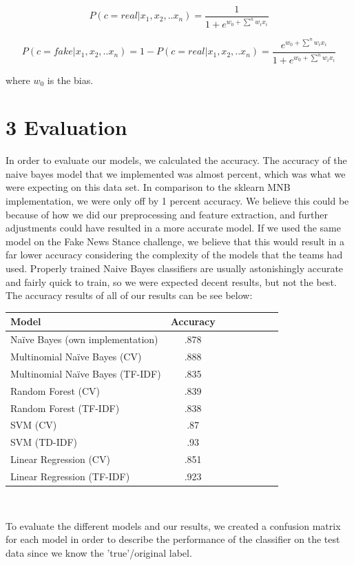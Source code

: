 \documentclass{neu_handout}
\begin{document}
$$P(c = real | x_1, x_2,..x_n) = \frac{1}{1 + e^{w_0 + \sum^n w_i x_i}} $$

$$P(c = fake | x_1, x_2,..x_n) = 1 - P(c = real | x_1, x_2,..x_n) = \frac{e^{w_0 + \sum^n w_i x_i}}{1+e^{w_0 + \sum^n w_i x_i}}$$

where $w_0$ is the bias.

\section*{3 Evaluation}

In order to evaluate our models, we calculated the accuracy. The accuracy of the naive bayes model that we implemented was almost percent, which was what we were expecting on this data set. In comparison to the sklearn MNB implementation, we were only off by 1 percent accuracy. We believe this could be because of how we did our preprocessing and feature extraction, and further adjustments could have resulted in a more accurate model. If we used the same model on the Fake News Stance challenge, we believe that this would result in a far lower accuracy considering the complexity of the models that the teams had used. Properly trained Naive Bayes classifiers are usually astonishingly accurate and fairly quick to train, so we were expected decent results, but not the best. The accuracy results of all of our results can be see below:

\begin{table}[h]
\centering
\begin{tabular}{l*{6}{c}r}
Model     & Accuracy  \\
\hline
Naïve Bayes  (own implementation) & .878   \\
Multinomial Naïve Bayes (CV)       & .888  \\
Multinomial Naïve Bayes (TF-IDF)      & .835  \\
Random Forest (CV)     & .839  \\
Random Forest (TF-IDF)     & .838  \\
SVM (CV)     & .87  \\
SVM (TD-IDF)     & .93  \\
Linear Regression (CV)  & .851 \\
Linear Regression (TF-IDF)  & .923 \\
\end{tabular}\\
\end{table}



To evaluate the different models and our results, we created a confusion matrix for each model in order to describe the performance of the classifier on the test data since we know the 'true'/original label.\\
\end{document}
